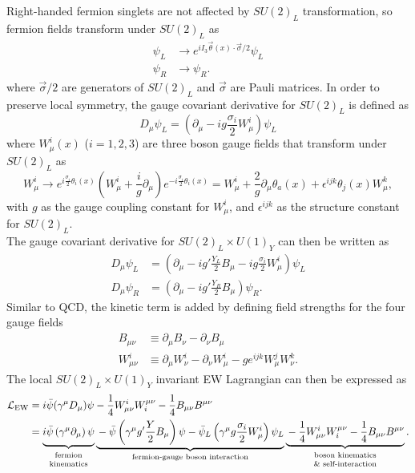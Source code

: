 \documentclass[../thesis.tex]{subfiles}
\begin{document}
Right-handed fermion singlets are not affected by $SU(2)_L$ transformation, so fermion fields transform under $SU(2)_L$ as
\begin{align}
\psi_L &\rightarrow e^{iI_3 \vec{\theta}(x)\cdot\vec{\sigma}/2} \psi_L \\
\psi_R &\rightarrow \psi_R.
\end{align}
where $\vec{\sigma}/2$ are generators of $SU(2)_L$ and $\vec{\sigma}$ are Pauli matrices. In order to preserve local symmetry, the gauge covariant derivative for $SU(2)_L$ is defined as
\begin{equation}
D_\mu \psi_L = \left( \partial_\mu - ig\frac{\sigma_i}{2}W_\mu^i \right) \psi_L
\end{equation}
where $W_\mu^i (x)$ ($i=1,2,3$) are three boson gauge fields that transform under $SU(2)_L$ as
\begin{equation}
W_\mu^i \rightarrow e^{i\displaystyle\frac{\sigma_i}{2}\theta_i(x)} \left( W_\mu^i+\frac{i}{g}\partial_\mu \right) e^{-i\displaystyle\frac{\sigma_i}{2}\theta_i(x)}
= W_\mu^i + \frac{2}{g}\partial_\mu \theta_a(x) + \epsilon^{ijk}\theta_j(x) W_\mu^k,
\end{equation}
with $g$ as the gauge coupling constant for $W^i_\mu$, and $\epsilon^{ijk}$ as the structure constant for $SU(2)_L$.\\
The gauge covariant derivative for $SU(2)_L \times U(1)_Y$ can then be written as
\begin{align}
D_\mu \psi_L &= \left( \partial_\mu - ig'\frac{Y_L}{2}B_\mu - ig\frac{\sigma_i}{2}W_\mu^i \right) \psi_L \\
D_\mu \psi_R &= \left( \partial_\mu - ig'\frac{Y_R}{2}B_\mu \right) \psi_R.
\end{align}
Similar to \acs{QCD}, the kinetic term is added by defining field strengths for the four gauge fields
\begin{align}
B_{\mu \nu}   &\equiv \partial_\mu B_\nu - \partial_\nu B_\mu \\
W_{\mu \nu}^i &\equiv \partial_\mu W^i_\nu - \partial_\nu W^i_\mu - g e^{ijk} W^j_\mu W^k_\nu.
\end{align}
The local $SU(2)_L \times U(1)_Y$ invariant \acs{EW} Lagrangian can then be expressed as
\begin{align}
\mathcal{L}_\text{EW} &= i\bar{\psi}(\gamma^\mu D_\mu)\psi - \frac{1}{4}W^i_{\mu\nu}W_i^{\mu\nu} - \frac{1}{4}B_{\mu\nu}B^{\mu\nu} \\
&= \underbrace{\vphantom{\frac{1}{4}}
i\bar{\psi}\left(\gamma^\mu\partial_\mu\right)\psi
}_{\substack{\text{fermion}\vphantom{\frac{1}{4}}\\ \text{kinematics}}}
\underbrace{\vphantom{\frac{1}{4}}
-\bar{\psi}\left(\gamma^\mu g'\frac{Y}{2}B_\mu\right)\psi - \bar{\psi}_L\left(\gamma^\mu g\frac{\sigma_i}{2}W_\mu^i\right)\psi_L
}_\text{fermion-gauge boson interaction}
\underbrace{\vphantom{\frac{1}{4}}
-\frac{1}{4}W^i_{\mu\nu}W_i^{\mu\nu} - \frac{1}{4}B_{\mu\nu}B^{\mu\nu}
}_{\substack{\text{boson kinematics}\vphantom{\frac{1}{4}}\\ \text{\& self-interaction}}}.
\end{align}
\end{document}
